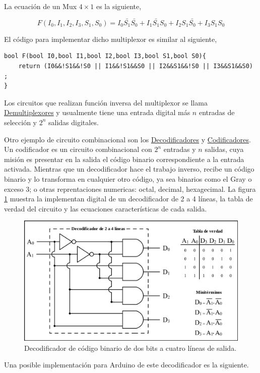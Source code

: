 La ecuación de un Mux $4 \times 1$ es la siguiente,

\begin{equation}
	F(I_0,I_1,I_2,I_3,S_1,S_0)=I_0\bar{S_1}\bar{S_0}+I_1\bar{S_1}S_0+I_2S_1\bar{S_0}+I_3S_1S_0
\end{equation} 

El código para implementar dicho multiplexor es similar al siguiente,
{\footnotesize 
\begin{lstlisting}[language=Arduino,numbers=none, showstringspaces=false]
bool F(bool I0,bool I1,bool I2,bool I3,bool S1,bool S0){
	return (I0&&!S1&&!S0 || I1&&!S1&&S0 || I2&&S1&&!S0 || I3&&S1&&S0) ;
}
\end{lstlisting}
}
Los circuitos que realizan función inversa del multiplexor se  llama \href{https://es.wikipedia.org/wiki/Demultiplexor}{Demultiplexores}  y usualmente tiene una entrada digital más $n$ entradas de selección y $2^{n}$ salidas digitales.

Otro ejemplo de circuito combinacional son los \href{URL}{Decodificadores} y \href{https://es.wikipedia.org/wiki/Codificador}{Codificadores}.  Un codificador es un circuito combinacional con $2^{n}$ entradas y $n$ salidas, cuya misión es presentar en la salida el código binario correspondiente a la entrada activada. Mientras que un decodificador hace el trabajo inverso, recibe un código binario y lo transforma en cualquier otro código, ya sea  binarios como el Gray o exceso 3; o otras reprentaciones numericas: octal, decimal, hexagecimal. La figura \ref{fig:decoderexample} muestra la implementan digital de un decodificador de 2 a 4 líneas, la tabla de verdad del circuito y las ecuaciones características de cada salida. 
\begin{figure}
	\centering
	\includegraphics[width=0.7\linewidth]{fig/Decoder_Example.png}
	\caption{Decodificador de código binario de dos bits a cuatro líneas de salida.  }
	\label{fig:decoderexample}
\end{figure}

Una posible implementación para Arduino de este decodificador es la siguiente.


